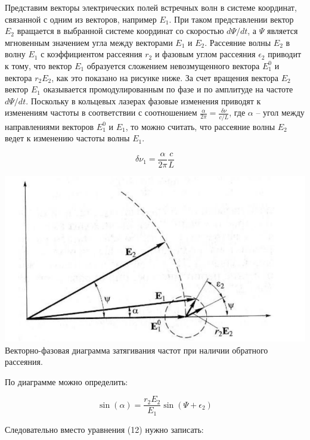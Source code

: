 \documentclass[a4paper,12pt]{article} %
\begin{document}
Представим векторы электрических полей встречных волн в системе координат, связанной с одним из векторов, например $E_1$. При таком представлении вектор $E_2$ вращается в выбранной системе координат со скоростью $d\Psi/dt$, а $\Psi$ является мгновенным значением угла между векторами $E_1$ и $E_2$. Рассеяние волны $E_2$ в волну $E_1$ с коэффициентом рассеяния $r_2$ и фазовым углом рассеяния $\epsilon_2$ приводит к тому, что вектор $E_1$ образуется сложением невозмущенного вектора $E_1^0$ и вектора $r_2E_2$, как это показано на рисунке ниже. За счет вращения вектора $E_2$ вектор $E_1$ оказывается промодулированным по фазе и по амплитуде на частоте $d\Psi/dt$. Поскольку в кольцевых лазерах фазовые изменения приводят к изменениям частоты в соответствии с соотношением $\frac{\alpha}{2\pi} = \frac{\delta \nu}{c/L}$, где $\alpha$ -- угол между направлениями векторов $E_1^0$ и $E_1$, то можно считать, что рассеяние волны $E_2$ ведет к изменению частоты волны $E_1$.

\begin{equation*}
    \delta \nu_1 = \frac {\alpha} {2\pi} \frac {c} {L}
\end{equation*}

\begin{center}
    \includegraphics[scale=0.8]{pic6}\\
    \caption{Векторно-фазовая диаграмма затягивания частот при наличии обратного рассеяния.}
\end{center}

По диаграмме можно определить:

\begin{equation*}
    \sin(\alpha) = \frac{r_2 E_2} {E_1} \sin(\Psi + \epsilon_2)
\end{equation*}

Следовательно вместо уравнения (12) нужно записать:
\end{document}

